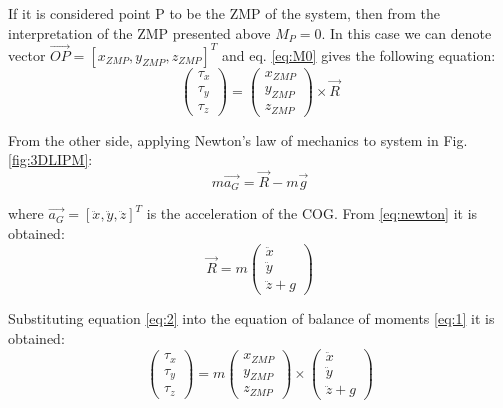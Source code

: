 If it is considered point P to be the ZMP of the system, then from the interpretation of the ZMP presented above $M_P = 0$. In this case we can denote vector $\overrightarrow{OP} = [x_{ZMP}, y_{ZMP}, z_{ZMP}]^T$ and eq. \ref{eq:M0} gives the following equation:
\begin{equation}
\begin{pmatrix}
\tau_x \\
\tau_y \\
\tau_z 
\end{pmatrix} 
=
\begin{pmatrix}
x_{ZMP} \\
y_{ZMP} \\
z_{ZMP}
\end{pmatrix}
\times \overrightarrow{R}
\label{eq:1}
\end{equation}

From the other side, applying Newton’s law of mechanics to system in Fig. \ref{fig:3DLIPM}:
\begin{equation}
m \overrightarrow{a_G} = \overrightarrow{R} - m\overrightarrow{g}
\label{eq:newton}
\end{equation}

where $\overrightarrow{a_G} = [\ddot{x}, \ddot{y}, \ddot{z}]^T$ is the acceleration of the COG. From \ref{eq:newton} it is obtained:
\begin{equation}
\overrightarrow{R} = m 
\begin{pmatrix}
\ddot{x} \\
\ddot{y} \\
\ddot{z} + g
\end{pmatrix}
\label{eq:2}
\end{equation}

Substituting equation \ref{eq:2} into the equation of balance of moments \ref{eq:1} it is obtained:
\begin{equation}
\begin{pmatrix}
\tau_x \\
\tau_y \\
\tau_z 
\end{pmatrix} 
= m
\begin{pmatrix}
x_{ZMP} \\
y_{ZMP} \\
z_{ZMP}
\end{pmatrix}
\times
\begin{pmatrix}
\ddot{x} \\
\ddot{y} \\
\ddot{z} + g
\end{pmatrix}
\end{equation}

